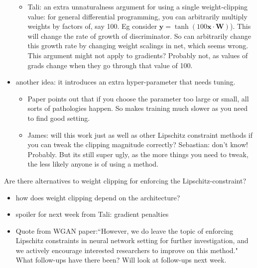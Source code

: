 \documentclass{article}
\begin{document}
\begin{itemize}
\begin{itemize}
			\item Tali: an extra unnaturalness argument for using a single weight-clipping value: for general differential programming, you can arbitrarily multiply weights by factors of, say 100. Eg consider $\mathbf{y}=\tanh(100 \mathbf{x} \cdot \mathbf{W})  $). This will change the rate of growth of discriminator. So can arbitrarily change this growth rate by changing weight scalings in net, which seems wrong. This argument might not apply to gradients? Probably not, as values of grads change when they go through that value of 100.
		\end{itemize}
		
		\item another idea: it introduces an extra hyper-parameter that needs tuning.
		\begin{itemize}
			\item Paper points out that if you choose the parameter too large or small, all sorts of pathologies happen. So makes training much slower as you need to find good setting.
			\item James: will this work just as well as other Lipschitz constraint methods if you can tweak the clipping magnitude correctly? Sebastian: don't know! Probably. But its still super ugly, as the more things you need to tweak, the less likely anyone is of using a method.
		\end{itemize}
	\end{itemize}
	
	Are there alternatives to weight clipping for enforcing the Lipschitz-constraint?
	\begin{itemize}
		\item how does weight clipping depend on the architecture? 
		\item spoiler for next week from Tali: gradient penalties
		\item Quote from WGAN paper:``However, we do leave the topic of enforcing Lipschitz constraints in neural network setting for further investigation, and we actively encourage interested researchers to improve on this method." What follow-ups have there been? Will look at follow-ups next week.
	\end{itemize}		
	
\end{document}
